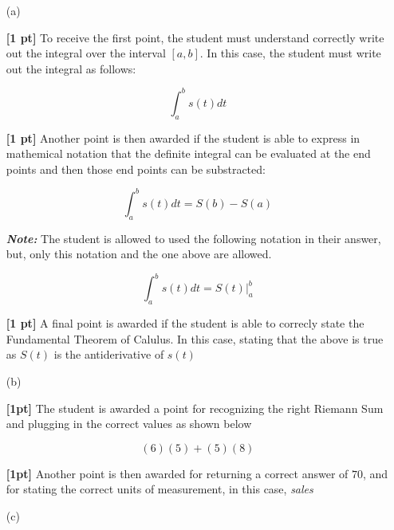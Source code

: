 \documentclass{article}
\newcommand{\qspace}{\vspace*{1.7em}}
\begin{document}
    \begin{enumerate}

		\item[(a)]
		
            \textbf{[1 pt]} To receive the first point, the student must understand correctly write out the integral over the interval
                            $[a, b]$. In this case, the student must write out the integral as follows:

                            \[
                                \int_a^b s(t)dt    
                            \]

            \textbf{[1 pt]} Another point is then awarded if the student is able to express in mathemical notation that the definite integral
                            can be evaluated at the end points and then those end points can be substracted:

                            \[
                                \int_a^b s(t)dt = S(b) - S(a)
                            \]

            \textbf{\textit{Note: }}The student is allowed to used the following notation in their answer, but, only this notation  
                                    and the one above are allowed.

                                    \[
                                        \int_a^b s(t)dt = S(t) |_{a}^{b}
                                    \]


		
            \textbf{[1 pt]} A final point is awarded if the student is able to correcly state the Fundamental Theorem of Calulus. In this case, 
                            stating that the above is true as $S(t)$ is the antiderivative of $s(t)$ \qspace 

		\item[(b)]
		
                \textbf{[1pt]} The student is awarded a point for recognizing the right Riemann Sum and plugging in the correct values
                as shown below

                \[
                        (6)(5) + (5)(8)
                \]

                \textbf{[1pt]} Another point is then awarded for returning a correct answer of $70$, and for stating the 
                correct units of measurement, in this case, \textit{sales} \qspace
		
        \item[(c)]
        

\end{enumerate}
\end{document}
